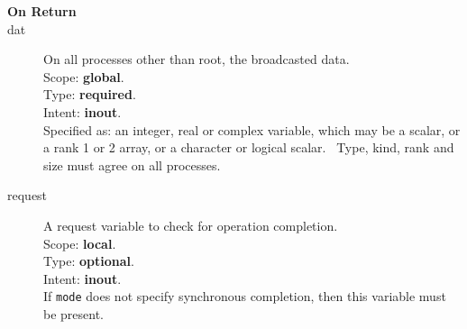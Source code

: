 \begin{description}
\item[\bf On Return]
\item[dat] On all processes other than  root, the broadcasted data.\\
Scope: {\bf global}.\\
Type: {\bf required}.\\
Intent: {\bf inout}.\\
Specified as: an integer, real or complex variable, which may be a
scalar, or a rank 1 or 2 array, or a character or logical scalar. \
Type, kind, rank and size must agree on all processes.
\item[request] A request variable to check for operation completion.\\
Scope: {\bf local}.\\
Type: {\bf optional}.\\
Intent: {\bf inout}.\\
If \verb|mode| does not specify synchronous completion, then this
variable must be present.
\end{description}

